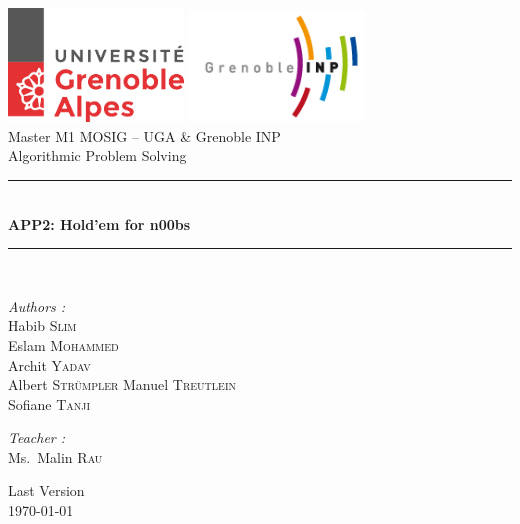 \documentclass[a4paper,12pt]{article}
\begin{document}

\begin{titlepage}
\begin{center}

\includegraphics[width=0.35\textwidth]{logo-uga.png}
\includegraphics[width=0.35\textwidth]{logoinp.png} \\[1cm]

{\large Master M1 MOSIG – UGA \& Grenoble INP} \\[0.8cm]
{\large Algorithmic Problem Solving}\\[0.5cm]

\rule{\linewidth}{0.5mm} \\[0.4cm]
{ \huge \bfseries APP2: Hold’em for n00bs \\[0.4cm] }
\rule{\linewidth}{0.5mm} \\[1.5cm]

\noindent
\begin{minipage}{0.4\textwidth}
  \begin{flushleft} \large
    \emph{Authors :}\\
    Habib \textsc{Slim}\\
    Eslam \textsc{Mohammed}\\
    Archit \textsc{Yadav}\\
    Albert \textsc{Strümpler}
    Manuel \textsc{Treutlein}\\
    Sofiane \textsc{Tanji}
  \end{flushleft}
\end{minipage}%
\begin{minipage}{0.4\textwidth}
  \begin{flushright} \large
    \emph{Teacher :} \\
    Ms.~Malin \textsc{Rau}\\
  \end{flushright}
\end{minipage}

\vfill

{\large Last Version \\ \today}

\end{center}
\end{titlepage}
\end{document}
